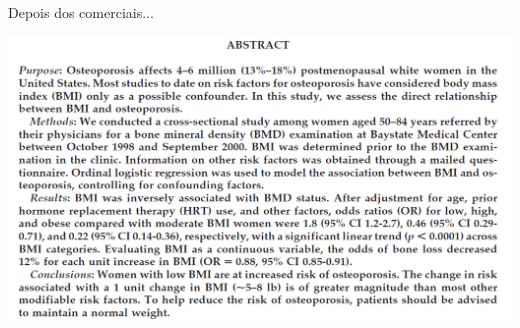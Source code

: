 \documentclass{beamer}
\begin{document}
\begin{frame}{\scriptsize Depois dos comerciais...}
  \begin{center}
    \includegraphics[width=1.175\textwidth]{Cap18-19/bmi-bmd-abstract}
  \end{center}
\end{frame}
\end{document}
